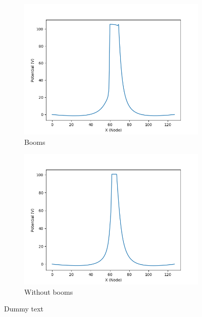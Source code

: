 \begin{center}
\begin{figure}[H]
  \begin{subfigure}[b]{0.61\textwidth}
    \includegraphics[width=\textwidth]{figures/MMO/minZ/Booms/PhiXBoomsMinZ.png}
    \caption{Booms}
    \label{fig:AvgAfter1000BoomsPlusX}
  \end{subfigure}
  \hfill
  \begin{subfigure}[b]{0.61\textwidth}
    \includegraphics[width=\textwidth]{figures/MMO/minZ/noBooms/PhiXnoBoomsMinZ.png}
    \caption{Without booms}
    \label{fig:AvgAfter1000noBoomsPlusX}
  \end{subfigure}
  \label{fig:AvgPhiDriftX}
  \caption{Dummy text}
\end{figure}
\end{center}

